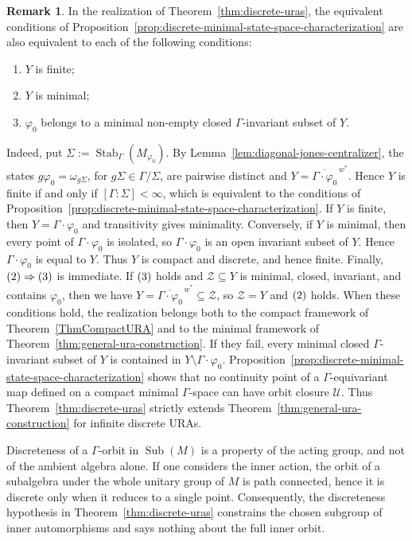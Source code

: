 \documentclass[12pt]{amsart} %
\theoremstyle{plain}
\theoremstyle{definition}
\newtheorem{remark}[theorem]{Remark}
\DeclareMathOperator{\Sub}{Sub}
\begin{document}
\begin{remark}\label{rmk:compactnessandbroaderconstruction}
In the realization of Theorem~\ref{thm:discrete-uras}, the
equivalent conditions of
Proposition~\ref{prop:discrete-minimal-state-space-characterization} are also
equivalent to each of the following conditions:
\begin{enumerate}
\item $Y$ is finite;
\item $Y$ is minimal;
\item $\varphi_0$ belongs to a minimal non-empty closed
$\Gamma$-invariant subset of $Y$.
\end{enumerate}
Indeed, put $\Sigma:=\operatorname{Stab}_\Gamma(M_{\varphi_0})$. By
Lemma~\ref{lem:diagonal-jones-centralizer}, the states
$g\varphi_0=\omega_{g\Sigma}$, for $g\Sigma\in\Gamma/\Sigma$, are pairwise
distinct and $Y=\overline{\Gamma\cdot\varphi_0}^{\,w^*}$. Hence $Y$ is finite if and only if $[\Gamma:\Sigma]<\infty$, which is
equivalent to the conditions of
Proposition~\ref{prop:discrete-minimal-state-space-characterization}.
If $Y$ is finite, then
$Y=\Gamma\cdot\varphi_0$ and transitivity gives minimality. Conversely,
if $Y$ is minimal, then every point of $\Gamma\cdot\varphi_0$ is isolated,
so $\Gamma\cdot\varphi_0$ is an open invariant subset of $Y$. Hence
$\Gamma\cdot\varphi_0$ is equal to $Y$. Thus $Y$ is compact and discrete,
and hence finite. Finally, ${\rm(2)}\Rightarrow{\rm(3)}$ is immediate. If
${\rm(3)}$ holds and
$\mathcal Z\subseteq Y$ is minimal, closed, invariant, and contains
$\varphi_0$, then we have $
Y=\overline{\Gamma\cdot\varphi_0}^{\,w^*}\subseteq\mathcal Z$, so $\mathcal Z=Y$ and ${\rm(2)}$ holds.
\medskip
\noindent When these conditions hold, the realization belongs both to the compact
framework of Theorem~\ref{ThmCompactURA} and to the minimal framework of
Theorem~\ref{thm:general-ura-construction}. If they fail, every minimal
closed $\Gamma$-invariant subset of $Y$ is contained in
$Y\setminus\Gamma\cdot\varphi_0$.
Proposition~\ref{prop:discrete-minimal-state-space-characterization}
shows that no continuity point of a $\Gamma$-equivariant map defined on a
compact minimal $\Gamma$-space can have orbit closure $\mathcal U$.
Thus Theorem~\ref{thm:discrete-uras} strictly extends
Theorem~\ref{thm:general-ura-construction} for infinite discrete URAs.
\end{remark}

\noindent Discreteness of a $\Gamma$-orbit in $\Sub(M)$ is a property of the
acting group, and not of the ambient algebra alone. If one considers the inner action, the orbit of a subalgebra under
the whole unitary group of $M$ is path connected, hence it is discrete only when
it reduces to a single point. Consequently, the discreteness hypothesis in
Theorem~\ref{thm:discrete-uras} constrains the chosen subgroup of inner
automorphisms and says nothing about the full inner orbit.
\medskip
\end{document}
